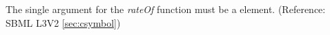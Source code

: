 The single argument for the \emph{rateOf}  function must be a  element.  (Reference: SBML L3V2 \ref{sec:csymbol})

